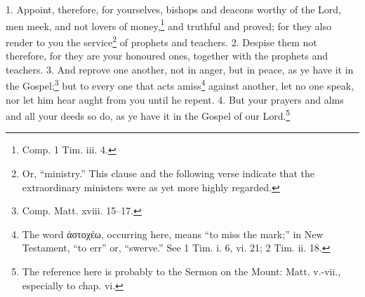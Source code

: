 
1. Appoint, therefore, for yourselves, bishops and deacons worthy of the Lord, men meek, and not lovers of money,\footnote{\par  Comp. 1 Tim. iii. 4.} and truthful and proved; for they also render to you the service\footnote{\par  Or, “ministry.” This clause and the following verse indicate that the extraordinary ministers were as yet more highly regarded.} of prophets and teachers. 2. Despise them not therefore, for they are your honoured ones, together with the prophets and teachers. 3. And reprove one another, not in anger, but in peace, as ye have it in the Gospel;\footnote{\par  Comp. Matt. xviii. 15–17.} but to every one that acts amiss\footnote{\par  The word \textgreek{ἀστοχέω}, occurring here, means “to miss the mark;” in New Testament, “to err” or, “swerve.” See 1 Tim. i. 6, vi. 21; 2 Tim. ii. 18.} against another, let no one speak, nor let him hear aught from you until he repent. 4. But your prayers and alms and all your deeds so do, as ye have it in the Gospel of our Lord.\footnote{\par  The reference here is probably to the Sermon on the Mount: Matt. v.-vii., especially to chap. vi.}


